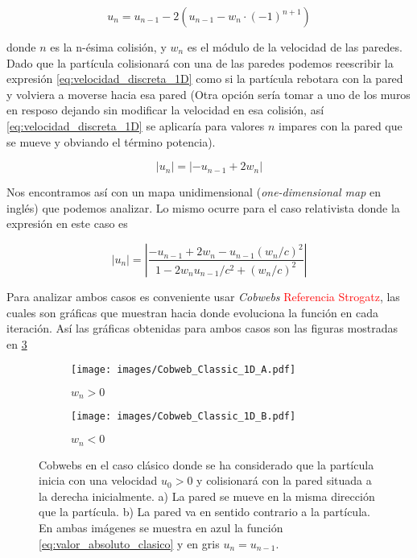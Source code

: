 \documentclass[11pt, spanish]{book}
\begin{document}
\begin{equation}\label{eq:velocidad_discreta_1D}
    u_n = u_{n-1} - 2\left( u_{n-1} - w_n \cdot (-1)^{n+1} \right)
\end{equation}

donde \( n \) es la n-ésima colisión, y \( w_n \) es el módulo de la velocidad de las paredes. Dado que la partícula colisionará con una de las paredes podemos reescribir la expresión \ref{eq:velocidad_discreta_1D} como si la partícula rebotara con la pared y volviera a moverse hacia esa pared (Otra opción sería tomar a uno de los muros en resposo dejando sin modificar la velocidad en esa colisión, así \ref{eq:velocidad_discreta_1D} se aplicaría para valores \( n \) impares con la pared que se mueve y obviando el término potencia). 

\begin{equation}\label{eq:valor_absoluto_clasico}
    \left| u_n \right| =\left| -u_{n-1} + 2w_n \right|
\end{equation}

Nos encontramos así con un mapa unidimensional (\textit{one-dimensional map} en inglés) que podemos analizar. Lo mismo ocurre para el caso relativista donde la expresión en este caso es

\begin{equation}\label{eq:valor_absoluto_relativista}
    \left| u_n \right| = \left|  \dfrac{-u_{n-1} + 2w_n - u_{n-1}(w_n/c)^2}{1 - 2w_n u_{n-1}/c^2 + (w_n/c)^2} \right|
\end{equation}

Para analizar ambos casos es conveniente usar \textit{Cobwebs} \textcolor{red}{Referencia Strogatz}, las cuales son gráficas que muestran hacia donde evoluciona la función en cada iteración. Así las gráficas obtenidas para ambos casos son las figuras mostradas en \ref{fig:Cobweb_Classic_1D}

\begin{figure}[H]
    \centering
    \begin{subfigure}[b]{0.49\textwidth}
        \centering
        \texttt{[image: images/Cobweb\_Classic\_1D\_A.pdf]}
        \caption{$w_n>0$}
        \label{fig:Cobweb_Classic_1D_A}
    \end{subfigure}
    \hfill
    \begin{subfigure}[b]{0.49\textwidth}
        \centering
        \texttt{[image: images/Cobweb\_Classic\_1D\_B.pdf]}
        \caption{$w_n<0$}
        \label{fig:Cobweb_Classic_1D_B}
    \end{subfigure}
    \caption{Cobwebs en el caso clásico donde se ha considerado que la partícula inicia con una velocidad $u_0 > 0$ y colisionará con la pared situada a la derecha inicialmente. a) La pared se mueve en la misma dirección que la partícula. b) La pared va en sentido contrario a la partícula. En ambas imágenes se muestra en azul la función \ref{eq:valor_absoluto_clasico} y en gris \( u_n = u_{n-1} \).}
        \label{fig:Cobweb_Classic_1D}
\end{figure}
\end{document}
